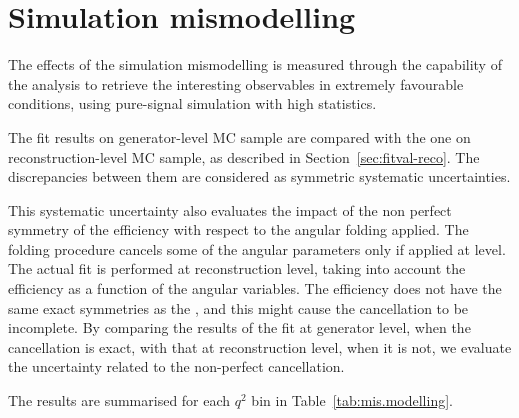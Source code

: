 


\section{Simulation mismodelling}
\label{sec:sys-mismodel}

The effects of the simulation mismodelling is measured through the capability of the analysis to retrieve the interesting observables in extremely favourable conditions, using pure-signal simulation with high statistics.

The fit results on generator-level MC sample are compared with the one on reconstruction-level MC sample, as described in Section~\ref{sec:fitval-reco}.
The discrepancies between them are considered as symmetric systematic uncertainties.

This systematic uncertainty also evaluates the impact of the non perfect symmetry of the efficiency with respect to the angular folding applied.
The folding procedure cancels some of the angular parameters only if applied at \pdf level.
The actual fit is performed at reconstruction level, taking into account the efficiency as a function of the angular variables.
The efficiency does not have the same exact symmetries as the \pdf, and this might cause the cancellation to be incomplete.
By comparing the results of the fit at generator level, when the cancellation is exact, with that at reconstruction level, when it is not, we evaluate the uncertainty related to the non-perfect cancellation.

The results are summarised for each $q^2$ bin in Table~\ref{tab:mis.modelling}.

